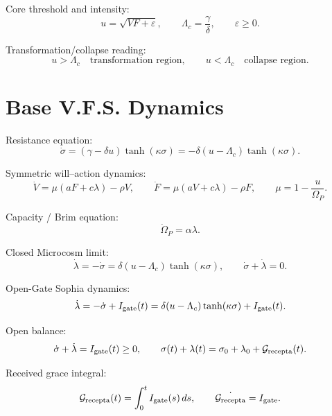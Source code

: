 \documentclass[11pt,a4paper]{article}
\newcommand{\Grec}{\mathcal G_{\rm recepta}}
\newcommand{\Igate}{I_{\rm gate}}
\newcommand{\Om}{\Omega_P}
\theoremstyle{remark}
\begin{document}
Core threshold and intensity:
\begin{equation}
  u=\sqrt{VF+\varepsilon},\qquad
  \Lambda_c=\frac{\gamma}{\delta},\qquad
  \varepsilon\ge 0.
\end{equation}

Transformation/collapse reading:
\begin{equation}
  u>\Lambda_c\quad\text{transformation region},
  \qquad
  u<\Lambda_c\quad\text{collapse region}.
\end{equation}

\section{Base V.F.S. Dynamics}

Resistance equation:
\begin{equation}
  \dot\sigma=(\gamma-\delta u)\tanh(\kappa\sigma)
  =-\delta(u-\Lambda_c)\tanh(\kappa\sigma).
\end{equation}

Symmetric will--action dynamics:
\begin{equation}
  \dot V=\mu(aF+c\lambda)-\rho V,
  \qquad
  \dot F=\mu(aV+c\lambda)-\rho F,
  \qquad
  \mu=1-\frac{u}{\Om}.
\end{equation}

Capacity / Brim equation:
\begin{equation}
  \dot\Om=\alpha\lambda.
\end{equation}

Closed Microcosm limit:
\begin{equation}
  \dot\lambda=-\dot\sigma=
  \delta(u-\Lambda_c)\tanh(\kappa\sigma),
  \qquad
  \dot\sigma+
  \dot\lambda=0.
\end{equation}

Open-Gate Sophia dynamics:
\begin{equation}
  \dot\lambda=-\dot\sigma+
  \Igate(t)
  =\delta(u-\Lambda_c)\tanh(\kappa\sigma)+\Igate(t).
\end{equation}

Open balance:
\begin{equation}
  \dot\sigma+
  \dot\lambda=\Igate(t)\ge0,
  \qquad
  \sigma(t)+\lambda(t)=\sigma_0+\lambda_0+\Grec(t).
\end{equation}

Received grace integral:
\begin{equation}
  \Grec(t)=\int_0^t \Igate(s)\,ds,
  \qquad
  \dot{\Grec}=\Igate.
\end{equation}
\end{document}
